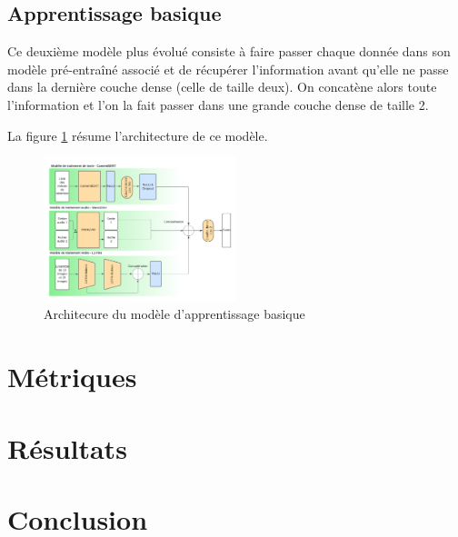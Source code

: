 \documentclass[a4paper]{article}
\begin{document}
\subsection{Apprentissage basique}
Ce deuxième modèle plus évolué consiste à faire passer chaque donnée dans son modèle pré-entraîné associé et de récupérer l'information avant qu'elle ne passe dans la dernière couche dense (celle de taille deux). On concatène alors toute l'information et l'on la fait passer dans une grande couche dense de taille 2.

La figure \ref{fig: basique} résume l'architecture de ce modèle.

\begin{figure}[H]
    \centering
    \includegraphics[width=0.5\textwidth]{second_model.png}
    \caption{Architecure du modèle d'apprentissage basique}
    \label{fig: basique}
\end{figure}

\section{Métriques}

\section{Résultats}

\section{Conclusion}
\end{document}
